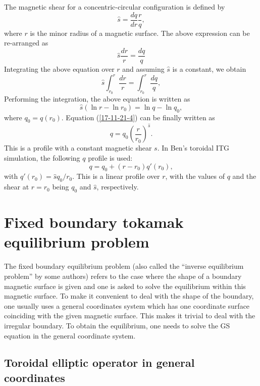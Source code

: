 \documentclass{llncs}
\begin{document}
The magnetic shear for a concentric-circular configuration is defined by
\begin{equation}
  \hat{s} = \frac{d q}{d r}  \frac{r}{q},
\end{equation}
where $r$ is the minor radius of a magnetic surface. The above expression can
be re-arranged as
\begin{equation}
  \hat{s} \frac{d r}{r} = \frac{d q}{q}
\end{equation}
Integrating the above equation over $r$ and assuming $\hat{s}$ is a constant,
we obtain
\begin{equation}
  \hat{s} \int_{r_0}^r \frac{d r}{r} = \int_{r_0}^r \frac{d q}{q},
\end{equation}
Performing the integration, the above equation is written as
\begin{equation}
  \label{17-11-21-4} \hat{s} (\ln r - \ln r_0) = \ln q - \ln q_0,
\end{equation}
where $q_0 = q (r_0)$. Equation (\ref{17-11-21-4}) can be finally written as
\begin{equation}
  q = q_0 \left( \frac{r}{r_0} \right)^{\hat{s}} .
\end{equation}
This is a profile with a constant magnetic shear $s$. In Ben's toroidal ITG
simulation, the following $q$ profile is used:
\begin{equation}
  q = q_0 + (r - r_0) q' (r_0),
\end{equation}
with $q' (r_0) = \hat{s} q_0 / r_0$. This is a linear profile over $r$, with
the values of $q$ and the shear at $r = r_0$ being $q_0$ and $\hat{s}$,
respectively.

\section{Fixed boundary tokamak equilibrium problem}

The fixed boundary equilibrium problem (also called the ``inverse equilibrium
problem'' by some authors) refers to the case where the shape of a boundary
magnetic surface is given and one is asked to solve the equilibrium within
this magnetic surface. To make it convenient to deal with the shape of the
boundary, one usually uses a general coordinates system which has one
coordinate surface coinciding with the given magnetic surface. This makes it
trivial to deal with the irregular boundary. To obtain the equilibrium, one
needs to solve the GS equation in the general coordinate system.

\subsection{Toroidal elliptic operator in general coordinates}
\end{document}
